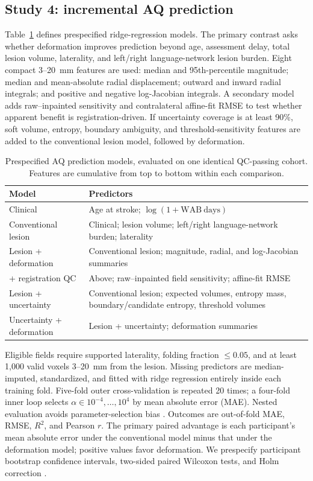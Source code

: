 \documentclass[runningheads]{llncs}
\begin{document}
\subsection{Study 4: incremental AQ prediction}
Table~\ref{tab:models} defines prespecified ridge-regression models. The primary
contrast asks whether deformation improves prediction beyond age, assessment
delay, total lesion volume, laterality, and left/right language-network lesion
burden. Eight compact 3--20~mm features are used: median and 95th-percentile
magnitude; median and mean-absolute radial displacement; outward and inward
radial integrals; and positive and negative log-Jacobian integrals. A secondary
model adds raw--inpainted sensitivity and contralateral affine-fit RMSE to test
whether apparent benefit is registration-driven. If uncertainty coverage is at
least 90\%, soft volume, entropy, boundary ambiguity, and threshold-sensitivity
features are added to the conventional lesion model, followed by deformation.

\begin{table}[t]
\caption{Prespecified AQ prediction models, evaluated on one identical
QC-passing cohort. Features are cumulative from top to bottom within each
comparison.}
\label{tab:models}
\centering
\scriptsize
\begin{tabularx}{\textwidth}{p{}X}
\toprule
Model & Predictors \\
\midrule
Clinical & Age at stroke; $\log(1+\mathrm{WAB\ days})$ \\
Conventional lesion & Clinical; lesion volume; left/right language-network burden; laterality \\
Lesion + deformation & Conventional lesion; magnitude, radial, and log-Jacobian summaries \\
+ registration QC & Above; raw--inpainted field sensitivity; affine-fit RMSE \\
Lesion + uncertainty & Conventional lesion; expected volumes, entropy mass, boundary/candidate entropy, threshold volumes \\
Uncertainty + deformation & Lesion + uncertainty; deformation summaries \\
\bottomrule
\end{tabularx}
\end{table}

Eligible fields require supported laterality, folding fraction $\leq0.05$, and
at least 1,000 valid voxels 3--20~mm from the lesion. Missing predictors are
median-imputed, standardized, and fitted with ridge regression entirely inside
each training fold. Five-fold outer cross-validation is repeated 20 times; a
four-fold inner loop selects $\alpha\in10^{-4},\ldots,10^4$ by mean absolute
error (MAE). Nested evaluation avoids parameter-selection bias
\cite{Varma2006}. Outcomes are out-of-fold MAE, RMSE, $R^2$, and Pearson $r$.
The primary paired advantage is each participant's mean absolute error under
the conventional model minus that under the deformation model; positive values
favor deformation. We prespecify participant bootstrap confidence intervals,
two-sided paired Wilcoxon tests, and Holm correction \cite{Holm1979}.
\end{document}
